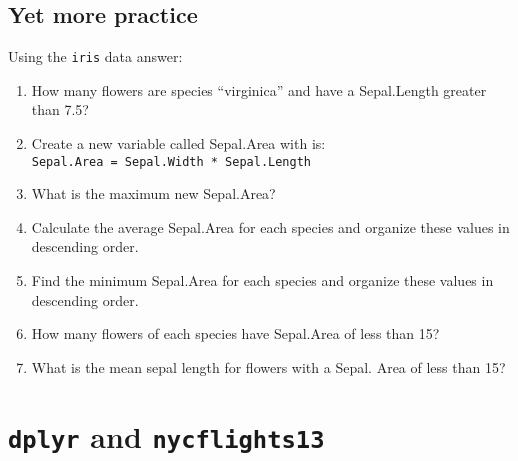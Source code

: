\documentclass[
]{book}
\providecommand{\tightlist}{%
  \setlength{\itemsep}{0pt}\setlength{\parskip}{0pt}}
\begin{document}
\hypertarget{yet-more-practice}{%
\section{Yet more practice}\label{yet-more-practice}}

Using the \texttt{iris} data answer:

\begin{enumerate}
\def\labelenumi{\arabic{enumi}.}
\tightlist
\item
  How many flowers are species ``virginica'' and have a Sepal.Length greater than 7.5?
\item
  Create a new variable called Sepal.Area with is: \texttt{Sepal.Area\ =\ Sepal.Width\ *\ Sepal.Length}
\item
  What is the maximum new Sepal.Area?
\item
  Calculate the average Sepal.Area for each species and organize these values in descending order.
\item
  Find the minimum Sepal.Area for each species and organize these values in descending order.
\item
  How many flowers of each species have Sepal.Area of less than 15?
\item
  What is the mean sepal length for flowers with a Sepal. Area of less than 15?
\end{enumerate}

\hypertarget{dplyr-and-nycflights13}{%
\chapter{\texorpdfstring{\texttt{dplyr} and \texttt{nycflights13}}{dplyr and nycflights13}}\label{dplyr-and-nycflights13}}
\end{document}
